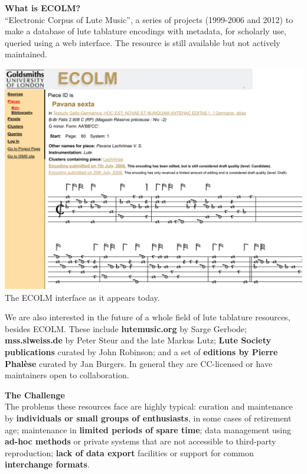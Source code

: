 \documentclass[a0,landscape]{a0poster}
\begin{document}
\begin{multicols}{3}
  
\begin{sloppypar}

  \noindent\textbf{\LARGE What is ECOLM?}\\

  \noindent``Electronic Corpus of Lute Music'', a series of projects
  (1999-2006 and 2012) to make a database of lute tablature encodings
  with metadata, for scholarly use, queried using a web interface. The
  resource is still available but not actively maintained.

  \begin{center}\vspace{1cm}
  \includegraphics[width=0.9\columnwidth,frame]{images/ecolm-screenshot}\\
  {\small The ECOLM interface as it appears today.}
  \end{center}\vspace{1cm}

  \noindent We are also interested in the future of a whole field of
  lute tablature resources, besides ECOLM. These include {\bf
    lutemusic.org} by Sarge Gerbode; {\bf mss.slweiss.de} by Peter
  Steur and the late Markus Lutz; {\bf Lute Society publications}
  curated by John Robinson; and a set of {\bf editions by Pierre
    Phal\`ese} curated by Jan Burgers. In general they are CC-licensed
  or have maintainers open to collaboration.

  \vspace{2cm}
  \noindent\textbf{\LARGE The Challenge}\\

  \noindent The problems these resources face are highly typical:
  curation and maintenance by \textbf{individuals or small groups of
    enthusiasts}, in some cases of retirement age; maintenance in
  \textbf{limited periods of spare time}; data management using
  \textbf{ad-hoc methods} or private systems that are not accessible
  to third-party reproduction; \textbf{lack of data export} facilities
  or support for common \textbf{interchange formats}.


\end{sloppypar}
\end{multicols}
\end{document}
